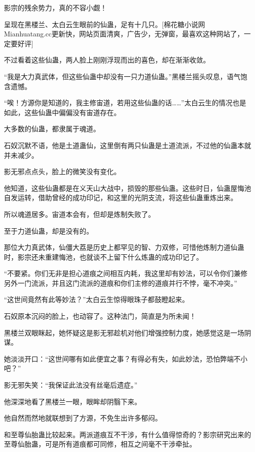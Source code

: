 
\begin{this_body}

影宗的残余势力，真的不容小觑！

呈现在黑楼兰、太白云生眼前的仙蛊，足有十几只。[棉花糖小说网Mianhuatang.cc更新快，网站页面清爽，广告少，无弹窗，最喜欢这种网站了，一定要好评]

不过看着这些仙蛊，两人脸上刚刚浮现而出的喜色，却在渐渐收敛。

“我是大力真武体，但这些仙蛊中却没有一只力道仙蛊。”黑楼兰摇头叹息，语气饱含遗憾。

“唉！方源你是知道的，我主修宙道，若用这些仙蛊的话……”太白云生的情况也是如此，这些仙蛊中偏偏没有宙道存在。

大多数的仙蛊，都隶属于魂道。

石奴沉默不语，他是土道蛊仙，这里倒有两只仙蛊是土道流派，不过他的仙蛊本就并未减少。

影无邪点点头，脸上的微笑没有变化。

他知道，这些仙蛊都是在义天山大战中，损毁的那些仙蛊。这些时日，仙蛊屋悔池自发运转，借助曾经的成功印记，和这里的光阴支流，将这些仙蛊重炼出来。

所以魂道居多。宙道本会有，但却是炼制失败了。

至于力道仙蛊，却是没有的。

那位大力真武体，仙僵大荔是历史上都罕见的智、力双修，可惜他炼制力道仙蛊时，影宗还未重建悔池，也就谈不上留下什么炼蛊的成功印记了。

“不要紧。你们无非是担心道痕之间相互内耗，我这里却有妙法，可以令你们兼修另外一门流派，并且这门流派的道痕和你们主修的道痕并行不悖，毫不冲突。”

“这世间竟然有此等妙法？”太白云生惊得眼珠子都鼓瞪起来。

石奴原本沉闷的脸上，也动容了。这种法门，简直是为所未闻！

黑楼兰双眼眯起，她怀疑这是影无邪趁机对他们增强控制力度，她感觉这是一场阴谋。

她淡淡开口：“这世间哪有如此便宜之事？有得必有失，如此妙法，恐怕弊端不小吧？”

影无邪失笑：“我保证此法没有丝毫后遗症。”

他深深地看了黑楼兰一眼，眼眸却阴翳下来。

他自然而然地就联想到了方源，不免生出许多郁闷。

和至尊仙胎蛊比较起来。两派道痕互不干涉，有什么值得惊奇的？影宗研究出来的至尊仙胎蛊，可是所有道痕都可同修，相互之间毫不干涉牵扯。


\end{this_body}
